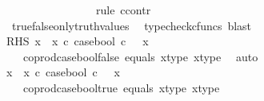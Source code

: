\begin{isabellebody}
\ \ \ \ \ \ \isamarkupfalse%
\ {\isachardoublequoteopen}{\isasymomega}{}\ {\isacharequal}{\kern0pt}\ {\isasymf}{\isachardoublequoteclose}\isanewline
\ \ \ \ \ \ \isamarkupfalse%
{\isacharparenleft}{\kern0pt}rule\ ccontr{\isacharparenright}{\kern0pt}\isanewline
\ \ \ \ \ \ \ \ \isamarkupfalse%
\ {\isachardoublequoteopen}{\isasymomega}{}\ {\isasymnoteq}\ {\isasymf}{\isachardoublequoteclose}\isanewline
\ \ \ \ \ \ \ \ \isamarkupfalse%
\ \isamarkupfalse%
\ {\isachardoublequoteopen}{\isasymomega}{}\ {\isacharequal}{\kern0pt}\ {\isasymt}{\isachardoublequoteclose}\isanewline
\ \ \ \ \ \ \ \ \ \ \isamarkupfalse%
\ \ true{\isacharunderscore}{\kern0pt}false{\isacharunderscore}{\kern0pt}only{\isacharunderscore}{\kern0pt}truth{\isacharunderscore}{\kern0pt}values\ \isamarkupfalse%
\ {\isacharparenleft}{\kern0pt}typecheck{\isacharunderscore}{\kern0pt}cfuncs{\isacharcomma}{\kern0pt}\ blast{\isacharparenright}{\kern0pt}\isanewline
\ \ \ \ \ \ \ \ \isamarkupfalse%
\ \isamarkupfalse%
\ RHS{\isacharcolon}{\kern0pt}\ {\isachardoublequoteopen}{\isacharparenleft}{\kern0pt}x{}\ {\isasymamalg}\ x{}\ {\isasymcirc}\isactrlsub c\ case{\isacharunderscore}{\kern0pt}bool{\isacharparenright}{\kern0pt}\ {\isasymcirc}\isactrlsub c\ {\isasymomega}{}\ {\isacharequal}{\kern0pt}\ x{}{\isachardoublequoteclose}\isanewline
\ \ \ \ \ \ \ \ \ \ \isamarkupfalse%
\ {\isacartoucheopen}{\isasymomega}{}\ {\isacharequal}{\kern0pt}\ {\isasymf}{\isacartoucheclose}\ coprod{\isacharunderscore}{\kern0pt}case{\isacharunderscore}{\kern0pt}bool{\isacharunderscore}{\kern0pt}false\ equals\ x{}{\isacharunderscore}{\kern0pt}type\ x{}{\isacharunderscore}{\kern0pt}type\ \isamarkupfalse%
\ auto\isanewline
\ \ \ \ \ \ \ \ \isamarkupfalse%
\ {\isachardoublequoteopen}{\isacharparenleft}{\kern0pt}x{}\ {\isasymamalg}\ x{}\ {\isasymcirc}\isactrlsub c\ case{\isacharunderscore}{\kern0pt}bool{\isacharparenright}{\kern0pt}\ {\isasymcirc}\isactrlsub c\ {\isasymomega}{}\ {\isacharequal}{\kern0pt}\ x{}{\isachardoublequoteclose}\isanewline
\ \ \ \ \ \ \ \ \ \ \isamarkupfalse%
\ {\isacartoucheopen}{\isasymomega}{}\ {\isacharequal}{\kern0pt}\ {\isasymt}{\isacartoucheclose}\ coprod{\isacharunderscore}{\kern0pt}case{\isacharunderscore}{\kern0pt}bool{\isacharunderscore}{\kern0pt}true\ equals\ x{}{\isacharunderscore}{\kern0pt}type\ x{}{\isacharunderscore}{\kern0pt}type\ \isamarkupfalse%

\end{isabellebody}
